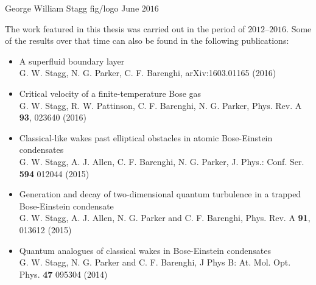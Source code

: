 \documentclass[11pt,openright]{report}
\makeatletter
\def\cleardoublepage{\clearpage\if@twoside \ifodd\c@page\else
\hbox{}
\vspace*{\fill}
\vspace{\fill}
\thispagestyle{empty}
\newpage
\if@twocolumn\hbox{}\newpage\fi\fi\fi}
\makeatother
\begin{document}
           {George William Stagg}       %
           {fig/logo}                 %
           {June $2016$}                %

  \thispagestyle{empty}
  \cleardoublepage
  \newpage
  \thispagestyle{empty}
  \noindent The work featured in this thesis was carried out in the period of $2012$--$2016$. Some of the results over that time can also be found in the following publications:
  \begin{itemize}
  \item A superfluid boundary layer\\
  {\footnotesize G. W. Stagg, N. G. Parker, C. F. Barenghi, arXiv:1603.01165 (2016)}
  \item Critical velocity of a finite-temperature Bose gas\\
  {\footnotesize G. W. Stagg, R. W. Pattinson, C. F. Barenghi, N. G. Parker, Phys. Rev. A {\bf 93}, 023640 (2016)}
  \item Classical-like wakes past elliptical obstacles in atomic Bose-Einstein condensates\\
  {\footnotesize G. W. Stagg, A. J. Allen, C. F. Barenghi, N. G. Parker, J. Phys.: Conf. Ser. {\bf 594} 012044 (2015)}
  \item Generation and decay of two-dimensional quantum turbulence in a trapped Bose-Einstein condensate\\
  {\footnotesize G. W. Stagg, A. J. Allen, N. G. Parker and C. F. Barenghi, Phys. Rev. A {\bf 91}, 013612 (2015)}
  \item Quantum analogues of classical wakes in Bose-Einstein condensates\\
  {\footnotesize G. W. Stagg, N. G. Parker and C. F. Barenghi, J Phys B: At. Mol. Opt. Phys. {\bf 47} 095304 (2014)}
  \end{itemize}
  \newpage
  \clearpage
  \thispagestyle{empty}
  \cleardoublepage
  \tableofcontents



  \clearpage                            %
  \thispagestyle{empty}                 %
  \cleardoublepage                      %
\end{document}
